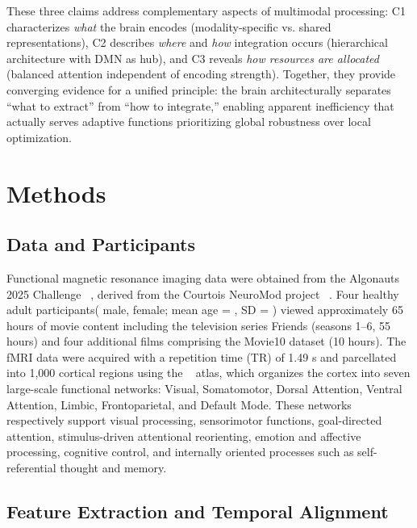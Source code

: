 \documentclass[10pt,letterpaper]{article}
\begin{document}
{\color{red}These three claims address complementary aspects of multimodal processing: C1 characterizes \textit{what} the brain encodes (modality-specific vs. shared representations), C2 describes \textit{where} and \textit{how} integration occurs (hierarchical architecture with DMN as hub), and C3 reveals \textit{how resources are allocated} (balanced attention independent of encoding strength). Together, they provide converging evidence for a unified principle: the brain architecturally separates ``what to extract'' from ``how to integrate,'' enabling apparent inefficiency that actually serves adaptive functions prioritizing global robustness over local optimization.}

\section{Methods}

\subsection{Data and Participants}

Functional magnetic resonance imaging data were obtained from the Algonauts 2025 Challenge ~\citep{gifford2024algonauts}, derived from the Courtois NeuroMod project ~\citep{boyle2020courtois}. Four healthy adult participants( male,  female; mean age =  , SD =  ) viewed approximately 65 hours of movie content including the television series Friends (seasons 1–6, 55 hours) and four additional films comprising the Movie10 dataset (10 hours). The fMRI data were acquired with a repetition time (TR) of 1.49 s and parcellated into 1,000 cortical regions using the ~\citet{schaefer2018local} atlas, which organizes the cortex into seven large-scale functional networks: Visual, Somatomotor, Dorsal Attention, Ventral Attention, Limbic, Frontoparietal, and Default Mode. These networks respectively support visual processing, sensorimotor functions, goal-directed attention, stimulus-driven attentional reorienting, emotion and affective processing, cognitive control, and internally oriented processes such as self-referential thought and memory.

\subsection{Feature Extraction and Temporal Alignment}
\end{document}
